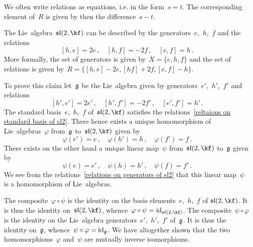 \begin{remark}
	We often write relations as equations, i.e. in the form~$s = t$.
	The corresponding element of~$R$ is given by then the difference~$s - t$.
\end{remark}


\begin{example}
	The Lie~algebra~$\sllie(2, \kf)$ can be described by the generators~$e$,~$h$,~$f$ and the relations
	\begin{equation}
		\label{reltaions on standard basis of sl2}
		[h,e] = 2e \,,
		\quad
		[h,f] = -2f \,,
		\quad
		[e,f] = h \,.
	\end{equation}
	More formally, the set of generators is given by~$X = \{ e, h, f \}$ and the set of relations is given by~$ R = \{ [h,e] - 2e, [hf] + 2f, [e,f] - h \} $.

	To prove this claim let~$\mathfrak{g}$ be the Lie~algebra given by generators~$e'$,~$h'$,~$f'$ and relations
	\begin{equation}
		\label{relations on generators of sl2}
		[h', e'] = 2 e' \,,
		\quad
		[h', f'] = -2 f' \,,
		\quad
		[e', f'] = h' \,.
	\end{equation}
	The standard basis~$e$,~$h$,~$f$ of~$\sllie(2, \kf)$ satisfies the relations~\eqref{reltaions on standard basis of sl2}.
	There hence exists a unique homomorphism of Lie~algebras~$\varphi$ from~$\mathfrak{g}$ to~$\sllie(2, \kf)$ given by
	\[
		\varphi(e') = e \,,
		\quad
		\varphi(h') = h \,,
		\quad
		\varphi(f') = f \,.
	\]
	There exists on the other hand a unique linear map~$\psi$ from~$\sllie(2, \kf)$ to~$\mathfrak{g}$ given by
	\[
		\psi(e) = e' \,,
		\quad
		\psi(h) = h' \,,
		\quad
		\psi(f) = f' \,.
	\]
	We see from the relations~\eqref{relations on generators of sl2} that this linear map~$\psi$ is a homomorphism of Lie~algebras.

	The composite~$\varphi \circ \psi$ is the identity on the basis elements~$e$,~$h$,~$f$ of$~\sllie(2, \kf)$.
	It is thus the identity on~$\sllie(2, \kf)$, whence~$\varphi \circ \psi = \id_{\sllie(2, \kf)}$.
	The composite~$\psi \circ \varphi$ is the identity on the Lie~algebra generators~$e'$,~$h'$,~$f'$ of~$\mathfrak{g}$.
	It is thus the identity on~$\mathfrak{g}$, whence~$\psi \circ \varphi = \mathrm{id}_{\mathfrak{g}}$.
	We have altogether shown that the two homomorphisms~$\varphi$ and~$\psi$ are mutually inverse isomorphisms.
\end{example}


